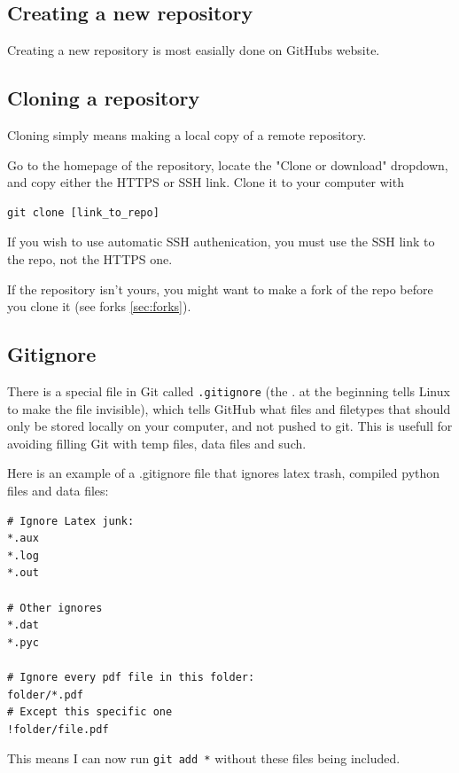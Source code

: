 \documentclass[12p,a4paper]{article}
\begin{document}
\subsection{Creating a new repository}
Creating a new repository is most easially done on GitHubs website.


\subsection{Cloning a repository}
Cloning simply means making a local copy of a remote repository.

Go to the homepage of the repository, locate the "Clone or download" dropdown, and copy either the HTTPS or SSH link. Clone it to your computer with
\begin{verbatim}
git clone [link_to_repo]
\end{verbatim}
If you wish to use automatic SSH authenication, you must use the SSH link to the repo, not the HTTPS one.

If the repository isn't yours, you might want to make a fork of the repo before you clone it (see forks \ref{sec:forks}).


\subsection{Gitignore}
There is a special file in Git called \texttt{.gitignore} (the . at the beginning tells Linux to make the file invisible), which tells GitHub what files and filetypes that should only be stored locally on your computer, and not pushed to git. This is usefull for avoiding filling Git with temp files, data files and such.

Here is an example of a .gitignore file that ignores latex trash, compiled python files and data files:
\begin{lstlisting}
# Ignore Latex junk:
*.aux
*.log
*.out

# Other ignores
*.dat
*.pyc

# Ignore every pdf file in this folder:
folder/*.pdf
# Except this specific one
!folder/file.pdf
\end{lstlisting}
This means I can now run \texttt{git add *} without these files being included.



\newpage
\end{document}
